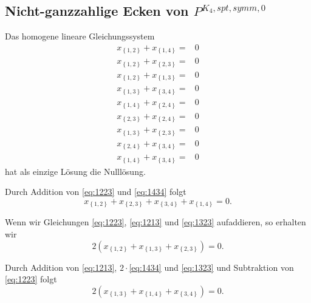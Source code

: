 \documentclass[10p,a4paper,BCOR = 12mm, DIV=15]{scrbook}
\begin{document}
{\subsection{Nicht-ganzzahlige Ecken von $P^{K_4, spt, symm, 0}$}

\label{sec:nicht_ganzz_P_p^4symm0}

\begin{Le}
\label{le:lgs_ecke}
Das homogene lineare Gleichungssystem
{
\allowdisplaybreaks
\begin{align}
x_{\left\{1, 2\right\}} + x_{\left\{1, 4\right\}} = & 0 \label{eq:1214} \\
x_{\left\{1, 2\right\}} + x_{\left\{2, 3\right\}} = & 0 \label{eq:1223} \\
x_{\left\{1, 2\right\}} + x_{\left\{1, 3\right\}} = & 0 \label{eq:1213} \\
x_{\left\{1, 3\right\}} + x_{\left\{3, 4\right\}} = & 0 \\
x_{\left\{1, 4\right\}} + x_{\left\{2, 4\right\}} = & 0 \\
x_{\left\{2, 3\right\}} + x_{\left\{2, 4\right\}} = & 0 \\
x_{\left\{1, 3\right\}} + x_{\left\{2, 3\right\}} = & 0 \label{eq:1323} \\
x_{\left\{2, 4\right\}} + x_{\left\{3, 4\right\}} = & 0 \\
x_{\left\{1, 4\right\}} + x_{\left\{3, 4\right\}} = & 0 \label{eq:1434}
\end{align}
}
hat als einzige Lösung die Nulllösung.
\end{Le}
\begin{bew}
Durch Addition von \eqref{eq:1223} und \eqref{eq:1434} folgt
\begin{equation}
x_{\left\{1, 2\right\}} + x_{\left\{2, 3\right\}} + x_{\left\{3, 4\right\}} + x_{\left\{1, 4\right\}} = 0. \label{eq:12233414}
\end{equation}

Wenn wir Gleichungen \eqref{eq:1223}, \eqref{eq:1213} und \eqref{eq:1323} aufaddieren, so erhalten wir
\begin{equation}
2 \left(x_{\left\{1, 2\right\}} + x_{\left\{1, 3\right\}} + x_{\left\{2, 3\right\}}\right) = 0. \label{eq:121323}
\end{equation}

Durch Addition von \eqref{eq:1213}, $2 \cdot $\eqref{eq:1434} und \eqref{eq:1323} und Subtraktion von \eqref{eq:1223} folgt
\begin{equation}
2 \left(x_{\left\{1, 3\right\}} + x_{\left\{1, 4\right\}} + x_{\left\{3, 4\right\}}\right) = 0. \label{eq:131434}
\end{equation}


\end{bew}}
\end{document}
